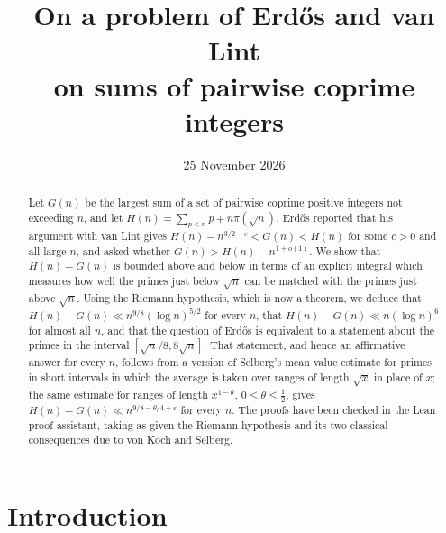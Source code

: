 \documentclass[11pt,reqno]{amsart}
\theoremstyle{definition}
\theoremstyle{remark}
\numberwithin{equation}{section}
\newcommand{\eps}{\varepsilon}
\begin{document}
\title[A problem of Erd\H{o}s and van Lint]{On a problem of Erd\H{o}s and van Lint\\ on sums of pairwise coprime integers}
\date{25 November 2026}

\begin{abstract}
Let $G(n)$ be the largest sum of a set of pairwise coprime positive integers not exceeding $n$, and let $H(n)=\sum_{p<n}p+n\pi(\sqrt n)$. Erd\H{o}s reported that his argument with van Lint gives $H(n)-n^{3/2-c}<G(n)<H(n)$ for some $c>0$ and all large $n$, and asked whether $G(n)>H(n)-n^{1+o(1)}$. We show that $H(n)-G(n)$ is bounded above and below in terms of an explicit integral which measures how well the primes just below $\sqrt n$ can be matched with the primes just above $\sqrt n$. Using the Riemann hypothesis, which is now a theorem, we deduce that $H(n)-G(n)\ll n^{9/8}(\log n)^{5/2}$ for every $n$, that $H(n)-G(n)\ll n(\log n)^6$ for almost all $n$, and that the question of Erd\H{o}s is equivalent to a statement about the primes in the interval $[\sqrt n/8,8\sqrt n]$. That statement, and hence an affirmative answer for every $n$, follows from a version of Selberg's mean value estimate for primes in short intervals in which the average is taken over ranges of length $\sqrt x$ in place of $x$; the same estimate for ranges of length $x^{1-\theta}$, $0\le\theta\le\frac12$, gives $H(n)-G(n)\ll n^{9/8-\theta/4+\eps}$ for every $n$. The proofs have been checked in the Lean proof assistant, taking as given the Riemann hypothesis and its two classical consequences due to von Koch and Selberg.
\end{abstract}

\maketitle

\section{Introduction}
\end{document}
